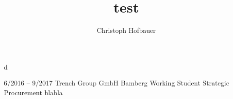 \documentclass[10pt,a4paper,draft]{article}
\author{Christoph Hofbauer}
\title{test}
\begin{document}
	
	d
	

\experience%
{6/2016 -- 9/2017}
{Trench Group GmbH}
{Bamberg}
{Working Student}
{Strategic Procurement}
{blabla}
\end{document}
